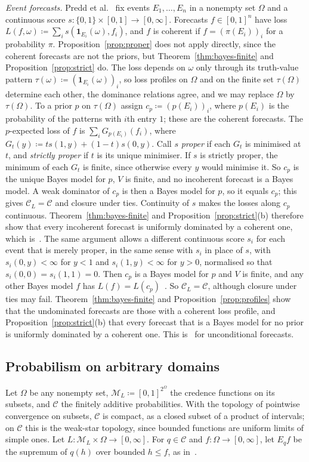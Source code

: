 \documentclass[11pt]{article}
\theoremstyle{definition}
\theoremstyle{remark}
\newcommand{\M}{\mathcal M}
\newcommand{\C}{\mathcal C}
\newcommand{\one}{\mathbf 1}
\begin{document}
\emph{Event forecasts.} Predd et al.~\cite{Predd} fix events $E_1,\dots,E_n$ in a nonempty set $\Omega$ and a continuous score $s:\{0,1\}\times[0,1]\to[0,\infty]$. Forecasts $f\in[0,1]^n$ have loss $L(f,\omega)\coloneqq\sum_is(\one_{E_i}(\omega),f_i)$, and $f$ is coherent if $f=(\pi(E_i))_i$ for a probability $\pi$. Proposition~\ref{prop:proper} does not apply directly, since the coherent forecasts are not the priors, but Theorem~\ref{thm:bayes-finite} and Proposition~\ref{prop:strict} do. The loss depends on $\omega$ only through its truth-value pattern $\tau(\omega)\coloneqq(\one_{E_i}(\omega))_i$, so loss profiles on $\Omega$ and on the finite set $\tau(\Omega)$ determine each other, the dominance relations agree, and we may replace $\Omega$ by $\tau(\Omega)$. To a prior $p$ on $\tau(\Omega)$ assign $c_p\coloneqq(p(E_i))_i$, where $p(E_i)$ is the probability of the patterns with $i$th entry $1$; these are the coherent forecasts. The $p$-expected loss of $f$ is $\sum_iG_{p(E_i)}(f_i)$, where $G_t(y)\coloneqq ts(1,y)+(1-t)s(0,y)$. Call $s$ \emph{proper} if each $G_t$ is minimised at $t$, and \emph{strictly proper} if $t$ is its unique minimiser. If $s$ is strictly proper, the minimum of each $G_t$ is finite, since otherwise every $y$ would minimise it. So $c_p$ is the unique Bayes model for $p$, $V$ is finite, and no incoherent forecast is a Bayes model. A weak dominator of $c_p$ is then a Bayes model for $p$, so it equals $c_p$; this gives $\C_L=\C$ and closure under ties. Continuity of $s$ makes the losses along $c_p$ continuous. Theorem~\ref{thm:bayes-finite} and Proposition~\ref{prop:strict}(b) therefore show that every incoherent forecast is uniformly dominated by a coherent one, which is~\cite[Theorem~1]{Predd}. The same argument allows a different continuous score $s_i$ for each event that is merely proper, in the same sense with $s_i$ in place of $s$, with $s_i(0,y)<\infty$ for $y<1$ and $s_i(1,y)<\infty$ for $y>0$, normalised so that $s_i(0,0)=s_i(1,1)=0$. Then $c_p$ is a Bayes model for $p$ and $V$ is finite, and any other Bayes model $f$ has $L(f)=L(c_p)$~\cite[Lemma~5]{SSK09}. So $\C_L=\C$, although closure under ties may fail. Theorem~\ref{thm:bayes-finite} and Proposition~\ref{prop:profiles} show that the undominated forecasts are those with a coherent loss profile, and Proposition~\ref{prop:strict}(b) that every forecast that is a Bayes model for no prior is uniformly dominated by a coherent one. This is~\cite[Theorem~2, Conclusion~3]{SSK09} for unconditional forecasts.

\subsection{Probabilism on arbitrary domains}\label{sec:nielsen}
Let $\Omega$ be any nonempty set, $\M_L\coloneqq[0,1]^{2^\Omega}$ the credence functions on its subsets, and $\C$ the finitely additive probabilities. With the topology of pointwise convergence on subsets, $\C$ is compact, as a closed subset of a product of intervals; on $\C$ this is the weak-star topology, since bounded functions are uniform limits of simple ones. Let $L:\M_L\times\Omega\to[0,\infty]$. For $q\in\C$ and $f:\Omega\to[0,\infty]$, let $E_qf$ be the supremum of $q(h)$ over bounded $h\le f$, as in~\cite[Appendix~A]{Nielsen}.
\end{document}
